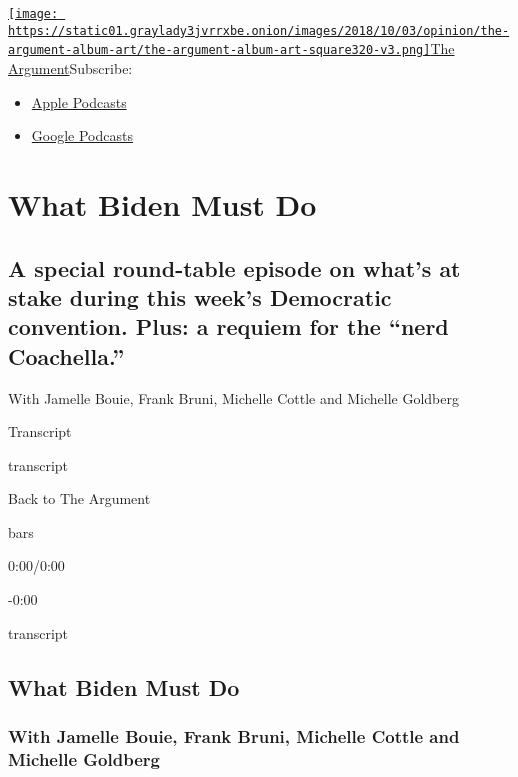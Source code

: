 \href{https://www.nytimes3xbfgragh.onion/column/the-argument}{\texttt{[image: https://static01.graylady3jvrrxbe.onion/images/2018/10/03/opinion/the-argument-album-art/the-argument-album-art-square320-v3.png]}The
Argument}Subscribe:

\begin{itemize}
\tightlist
\item
  \href{https://itunes.apple.com/us/podcast/id1438024613}{Apple
  Podcasts}
\item
  \href{https://www.google.com/podcasts?feed=aHR0cHM6Ly9yc3MuYXJ0MTkuY29tL3RoZS1hcmd1bWVudA\%3D\%3D}{Google
  Podcasts}
\end{itemize}

\hypertarget{what-biden-must-do-1}{%
\section{What Biden Must Do}\label{what-biden-must-do-1}}

\hypertarget{a-special-round-table-episode-on-whats-at-stake-during-this-weeks-democratic-convention-plus-a-requiem-for-the-nerd-coachella-1}{%
\subsection{A special round-table episode on what's at stake during this
week's Democratic convention. Plus: a requiem for the ``nerd
Coachella.''}\label{a-special-round-table-episode-on-whats-at-stake-during-this-weeks-democratic-convention-plus-a-requiem-for-the-nerd-coachella-1}}

With Jamelle Bouie, Frank Bruni, Michelle Cottle and Michelle Goldberg

Transcript

transcript

Back to The Argument

bars

0:00/0:00

-0:00

transcript

\hypertarget{what-biden-must-do-2}{%
\subsection{What Biden Must Do}\label{what-biden-must-do-2}}

\hypertarget{with-jamelle-bouie-frank-bruni-michelle-cottle-and-michelle-goldberg-1}{%
\subsubsection{With Jamelle Bouie, Frank Bruni, Michelle Cottle and
Michelle
Goldberg}\label{with-jamelle-bouie-frank-bruni-michelle-cottle-and-michelle-goldberg-1}}

